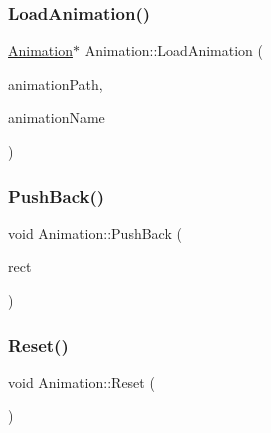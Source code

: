 \mbox{\label{class_animation_a0d759aa2e42ea4f5192be298a8806d00}} 
\subsubsection{\texorpdfstring{LoadAnimation()}{LoadAnimation()}}
{\footnotesize\ttfamily \mbox{\hyperlink{class_animation}{Animation}}$\ast$ Animation\+::\+Load\+Animation (\begin{DoxyParamCaption}\item[{const char $\ast$}]{animation\+Path,  }\item[{const char $\ast$}]{animation\+Name }\end{DoxyParamCaption})\hspace{0.3cm}{\ttfamily [inline]}}

\mbox{\label{class_animation_adff0991c58fb4e828ac9e4be2c05721a}} 
\subsubsection{\texorpdfstring{PushBack()}{PushBack()}}
{\footnotesize\ttfamily void Animation\+::\+Push\+Back (\begin{DoxyParamCaption}\item[{const S\+D\+L\+\_\+\+Rect \&}]{rect }\end{DoxyParamCaption})\hspace{0.3cm}{\ttfamily [inline]}}

\mbox{\label{class_animation_aa78f45d8a9f69eaed31031febb722594}} 
\subsubsection{\texorpdfstring{Reset()}{Reset()}}
{\footnotesize\ttfamily void Animation\+::\+Reset (\begin{DoxyParamCaption}{ }\end{DoxyParamCaption})\hspace{0.3cm}{\ttfamily [inline]}}

\mbox{\label{class_animation_a31c11cf5d995a649502f26725f30670d}} 
